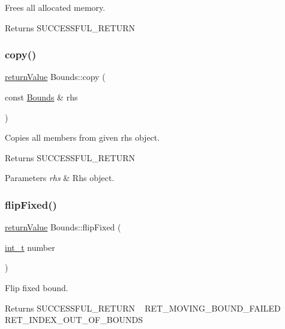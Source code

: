 Frees all allocated memory. \begin{DoxyReturn}{Returns}
S\+U\+C\+C\+E\+S\+S\+F\+U\+L\+\_\+\+R\+E\+T\+U\+RN 
\end{DoxyReturn}
\mbox{\label{class_bounds_abb34af9c6fbd53b591aaa65db6108bac}} 
\subsubsection{\texorpdfstring{copy()}{copy()}}
{\footnotesize\ttfamily \hyperlink{_message_handling_8hpp_a81d556f613bfbabd0b1f9488c0fa865e}{return\+Value} Bounds\+::copy (\begin{DoxyParamCaption}\item[{const \hyperlink{class_bounds}{Bounds} \&}]{rhs }\end{DoxyParamCaption})\hspace{0.3cm}{\ttfamily [protected]}}

Copies all members from given rhs object. \begin{DoxyReturn}{Returns}
S\+U\+C\+C\+E\+S\+S\+F\+U\+L\+\_\+\+R\+E\+T\+U\+RN 
\end{DoxyReturn}

\begin{DoxyParams}{Parameters}
{\em rhs} & Rhs object. \\
\hline
\end{DoxyParams}
\mbox{\label{class_bounds_a161a0615c8a76dc82c373691b4dd6eb5}} 
\subsubsection{\texorpdfstring{flip\+Fixed()}{flipFixed()}}
{\footnotesize\ttfamily \hyperlink{_message_handling_8hpp_a81d556f613bfbabd0b1f9488c0fa865e}{return\+Value} Bounds\+::flip\+Fixed (\begin{DoxyParamCaption}\item[{\hyperlink{_types_8hpp_ab6fd6105e64ed14a0c9281326f05e623}{int\+\_\+t}}]{number }\end{DoxyParamCaption})}

Flip fixed bound. \begin{DoxyReturn}{Returns}
S\+U\+C\+C\+E\+S\+S\+F\+U\+L\+\_\+\+R\+E\+T\+U\+RN ~\newline
 R\+E\+T\+\_\+\+M\+O\+V\+I\+N\+G\+\_\+\+B\+O\+U\+N\+D\+\_\+\+F\+A\+I\+L\+ED ~\newline
 R\+E\+T\+\_\+\+I\+N\+D\+E\+X\+\_\+\+O\+U\+T\+\_\+\+O\+F\+\_\+\+B\+O\+U\+N\+DS 
\end{DoxyReturn}
\mbox{\label{class_bounds_a4e2397e0080e4cbc355ffcf386fda8a0}} 
